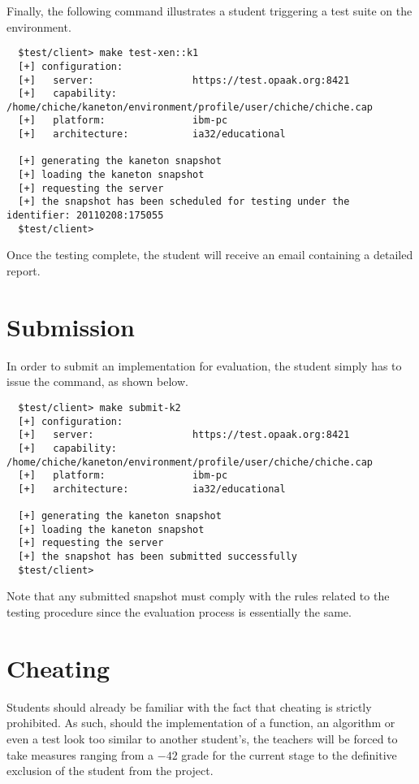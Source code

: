 Finally, the following command illustrates a student triggering a test
suite on the  environment.

\begin{verbatim}
  $test/client> make test-xen::k1
  [+] configuration:
  [+]   server:                 https://test.opaak.org:8421
  [+]   capability:             /home/chiche/kaneton/environment/profile/user/chiche/chiche.cap
  [+]   platform:               ibm-pc
  [+]   architecture:           ia32/educational

  [+] generating the kaneton snapshot
  [+] loading the kaneton snapshot
  [+] requesting the server
  [+] the snapshot has been scheduled for testing under the identifier: 20110208:175055
  $test/client> 
\end{verbatim}

Once the testing complete, the student will receive an email containing
a detailed report.

%
%

\section{Submission}

In order to submit an implementation for evaluation, the student simply
has to issue the  command, as shown below.

\begin{verbatim}
  $test/client> make submit-k2
  [+] configuration:
  [+]   server:                 https://test.opaak.org:8421
  [+]   capability:             /home/chiche/kaneton/environment/profile/user/chiche/chiche.cap
  [+]   platform:               ibm-pc
  [+]   architecture:           ia32/educational

  [+] generating the kaneton snapshot
  [+] loading the kaneton snapshot
  [+] requesting the server
  [+] the snapshot has been submitted successfully
  $test/client> 
\end{verbatim}

Note that any submitted snapshot must comply with the rules related to the
testing procedure since the evaluation process is essentially the same.

%
%

\section{Cheating}

Students should already be familiar with the fact that cheating is
strictly prohibited. As such, should the implementation of a function,
an algorithm or even a test look too similar to another student's, the
teachers will be forced to take measures ranging from a $-42$ grade for
the current stage to the definitive exclusion of the student from the
project.
